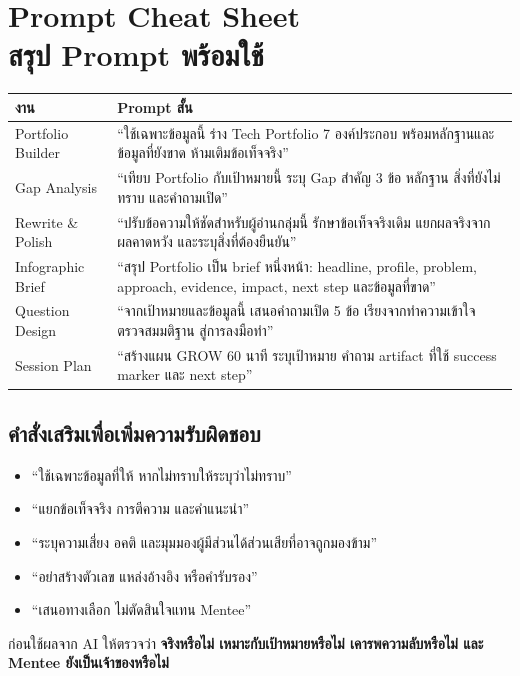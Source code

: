 \chapter{Prompt Cheat Sheet\\สรุป Prompt พร้อมใช้}

\begin{longtable}{P{.2\textwidth}P{.68\textwidth}}
\toprule
\textbf{งาน} & \textbf{Prompt สั้น}\\
\midrule
Portfolio Builder & \enquote{ใช้เฉพาะข้อมูลนี้ ร่าง Tech Portfolio 7 องค์ประกอบ พร้อมหลักฐานและข้อมูลที่ยังขาด ห้ามเติมข้อเท็จจริง}\\
Gap Analysis & \enquote{เทียบ Portfolio กับเป้าหมายนี้ ระบุ Gap สำคัญ 3 ข้อ หลักฐาน สิ่งที่ยังไม่ทราบ และคำถามเปิด}\\
Rewrite \& Polish & \enquote{ปรับข้อความให้ชัดสำหรับผู้อ่านกลุ่มนี้ รักษาข้อเท็จจริงเดิม แยกผลจริงจากผลคาดหวัง และระบุสิ่งที่ต้องยืนยัน}\\
Infographic Brief & \enquote{สรุป Portfolio เป็น brief หนึ่งหน้า: headline, profile, problem, approach, evidence, impact, next step และข้อมูลที่ขาด}\\
Question Design & \enquote{จากเป้าหมายและข้อมูลนี้ เสนอคำถามเปิด 5 ข้อ เรียงจากทำความเข้าใจ ตรวจสมมติฐาน สู่การลงมือทำ}\\
Session Plan & \enquote{สร้างแผน GROW 60 นาที ระบุเป้าหมาย คำถาม artifact ที่ใช้ success marker และ next step}\\
\bottomrule
\end{longtable}

\section*{คำสั่งเสริมเพื่อเพิ่มความรับผิดชอบ}
\begin{itemize}
  \item \enquote{ใช้เฉพาะข้อมูลที่ให้ หากไม่ทราบให้ระบุว่าไม่ทราบ}
  \item \enquote{แยกข้อเท็จจริง การตีความ และคำแนะนำ}
  \item \enquote{ระบุความเสี่ยง อคติ และมุมมองผู้มีส่วนได้ส่วนเสียที่อาจถูกมองข้าม}
  \item \enquote{อย่าสร้างตัวเลข แหล่งอ้างอิง หรือคำรับรอง}
  \item \enquote{เสนอทางเลือก ไม่ตัดสินใจแทน Mentee}
\end{itemize}

\begin{keytakeaway}
ก่อนใช้ผลจาก AI ให้ตรวจว่า \textbf{จริงหรือไม่ เหมาะกับเป้าหมายหรือไม่ เคารพความลับหรือไม่ และ Mentee ยังเป็นเจ้าของหรือไม่}
\end{keytakeaway}

